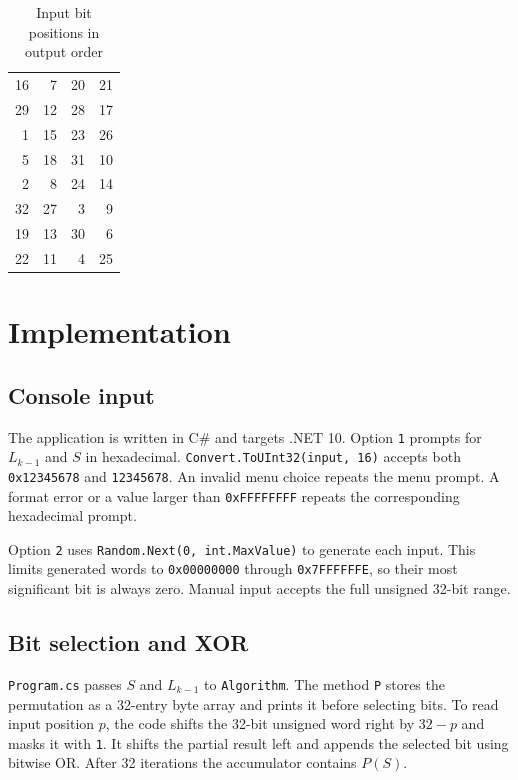 \documentclass{tum_report}
\newcommand{\hex}[1]{\texttt{0x#1}}
\begin{document}
\begin{table}[H]
\caption{Input bit positions in output order}
\label{tab:permutation}
\centering
{}
\begin{tabular}{rrrr}
\toprule
16 & 7  & 20 & 21 \\
29 & 12 & 28 & 17 \\
1  & 15 & 23 & 26 \\
5  & 18 & 31 & 10 \\
2  & 8  & 24 & 14 \\
32 & 27 & 3  & 9  \\
19 & 13 & 30 & 6  \\
22 & 11 & 4  & 25 \\
\bottomrule
\end{tabular}
\end{table}

\clearpage
\chapter{Implementation}
\section{Console input}
The application is written in C\# and targets .NET 10.
Option \texttt{1} prompts for $L_{k-1}$ and $S$ in hexadecimal.
\texttt{Convert.ToUInt32(input, 16)} accepts both \hex{12345678} and
\texttt{12345678}. An invalid menu choice repeats the menu prompt.
A format error or a value larger than \hex{FFFFFFFF} repeats the
corresponding hexadecimal prompt.

Option \texttt{2} uses \texttt{Random.Next(0, int.MaxValue)} to generate
each input. This limits generated words to \hex{00000000} through
\hex{7FFFFFFE}, so their most significant bit is always zero. Manual input
accepts the full unsigned 32-bit range.

\section{Bit selection and XOR}
\texttt{Program.cs} passes $S$ and $L_{k-1}$ to \texttt{Algorithm}.
The method \texttt{P} stores the permutation as a 32-entry byte array and
prints it before selecting bits. To read input position $p$, the code
shifts the 32-bit unsigned word right by $32-p$ and masks it with
\texttt{1}. It shifts the partial result left and appends the selected bit
using bitwise OR. After 32 iterations the accumulator contains $P(S)$.

{

}
\end{document}

